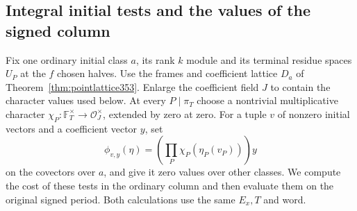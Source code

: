 \documentclass[a4paper,11pt]{article}
\theoremstyle{definition}
\theoremstyle{remark}
\numberwithin{equation}{section}
\begin{document}
\subsection{Integral initial tests and the values of the signed column}
\label{sec:initialmoments396}

Fix one ordinary initial class \(a\), its rank \(k\) module and
its terminal residue spaces \(U_P\) at the \(f\) chosen halves.
Use the frames and coefficient lattice \(D_a\) of
Theorem~\ref{thm:pointlattice353}. Enlarge the coefficient
field \(J\) to contain the character values used below. At
every \(P\mid\pi_T\) choose a nontrivial multiplicative character
\(\chi_P:\mathbb F_T^\times\to\mathcal O_J^\times\), extended
by zero at zero. For a tuple \(v\) of nonzero initial vectors
and a coefficient vector \(y\), set
\[
     \phi_{v,y}(\eta)
         =\left(\prod_P\chi_P(\eta_P(v_P))\right)y
\]
on the covectors over \(a\), and give it zero values over
other classes. We compute the cost of these tests in the
ordinary column and then evaluate them on the original signed
period. Both calculations use the same \(E_x,T\) and word.
\end{document}
